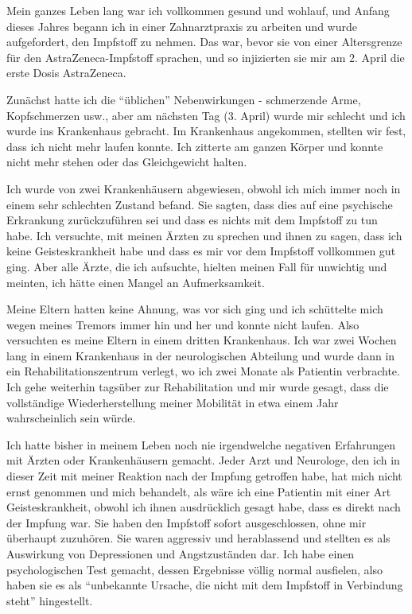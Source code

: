 Mein ganzes Leben lang war ich vollkommen gesund und wohlauf, und Anfang dieses
Jahres begann ich in einer Zahnarztpraxis zu arbeiten und wurde aufgefordert,
den Impfstoff zu nehmen. Das war, bevor sie von einer Altersgrenze für den
AstraZeneca-Impfstoff sprachen, und so injizierten sie mir am 2. April die erste
Dosis AstraZeneca.

Zunächst hatte ich die “üblichen” Nebenwirkungen - schmerzende Arme,
Kopfschmerzen usw., aber am nächsten Tag (3. April) wurde mir schlecht und ich
wurde ins Krankenhaus gebracht. Im Krankenhaus angekommen, stellten wir fest,
dass ich nicht mehr laufen konnte. Ich zitterte am ganzen Körper und konnte
nicht mehr stehen oder das Gleichgewicht halten.

Ich wurde von zwei Krankenhäusern abgewiesen, obwohl ich mich immer noch in
einem sehr schlechten Zustand befand. Sie sagten, dass dies auf eine psychische
Erkrankung zurückzuführen sei und dass es nichts mit dem Impfstoff zu tun
habe. Ich versuchte, mit meinen Ärzten zu sprechen und ihnen zu sagen, dass ich
keine Geisteskrankheit habe und dass es mir vor dem Impfstoff vollkommen gut
ging. Aber alle Ärzte, die ich aufsuchte, hielten meinen Fall für unwichtig und
meinten, ich hätte einen Mangel an Aufmerksamkeit.

Meine Eltern hatten keine Ahnung, was vor sich ging und ich schüttelte mich
wegen meines Tremors immer hin und her und konnte nicht laufen. Also versuchten
es meine Eltern in einem dritten Krankenhaus. Ich war zwei Wochen lang in einem
Krankenhaus in der neurologischen Abteilung und wurde dann in ein
Rehabilitationszentrum verlegt, wo ich zwei Monate als Patientin verbrachte. Ich
gehe weiterhin tagsüber zur Rehabilitation und mir wurde gesagt, dass die
vollständige Wiederherstellung meiner Mobilität in etwa einem Jahr
wahrscheinlich sein würde.

Ich hatte bisher in meinem Leben noch nie irgendwelche negativen Erfahrungen mit
Ärzten oder Krankenhäusern gemacht. Jeder Arzt und Neurologe, den ich in dieser
Zeit mit meiner Reaktion nach der Impfung getroffen habe, hat mich nicht ernst
genommen und mich behandelt, als wäre ich eine Patientin mit einer Art
Geisteskrankheit, obwohl ich ihnen ausdrücklich gesagt habe, dass es direkt nach
der Impfung war. Sie haben den Impfstoff sofort ausgeschlossen, ohne mir
überhaupt zuzuhören. Sie waren aggressiv und herablassend und stellten es als
Auswirkung von Depressionen und Angstzuständen dar. Ich habe einen
psychologischen Test gemacht, dessen Ergebnisse völlig normal ausfielen, also
haben sie es als “unbekannte Ursache, die nicht mit dem Impfstoff in Verbindung
steht” hingestellt.

